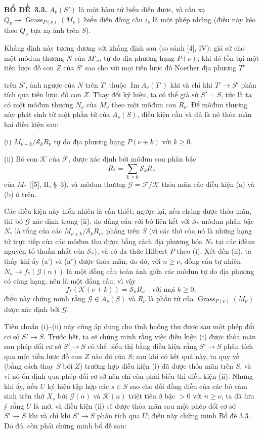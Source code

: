 \documentclass[11pt,twoside,openany]{book}
\numberwithin{equation}{section}
\newcommand{\src}[1]{%
  \phantomsection\hypertarget{src:\fgasourceid:#1}{}%
  \marginpar{\raggedleft\footnotesize\sffamily #1}%
}
\newcommand{\fgasourceid}{unset}
\newcommand{\result}[2]{\par\medskip\noindent\textbf{#1\if\relax\detokenize{#2}\relax\else\ #2\fi.}\quad}
\begin{document}
\result{BỔ ĐỀ}{3.3} $A_\nu(S')$ là một hàm tử biểu diễn được, và cấu xạ
$Q_\nu\longrightarrow\operatorname{Grass}_{P(\nu)}(M_\nu)$ biểu diễn đồng cấu
$i_\nu$ là một phép nhúng (điều này kéo theo $Q_\nu$ tựa xạ ảnh trên $S$).

Khẳng định này tương đương với khẳng định sau (so sánh [4], IV): giả sử cho
một môđun thương $N$ của $M'_\nu$, tự do địa phương hạng $P(\nu)$; khi đó tồn
tại một tiền lược đồ con $Z$ của $S'$ sao cho với mọi tiền lược đồ Noether địa
phương $T'$
\src{262}
trên $S'$, ảnh ngược của $N$ trên $T'$ thuộc
$\operatorname{Im}A_\nu(T')$ khi và chỉ khi $T'\longrightarrow S'$ phân tích
qua tiền lược đồ con $Z$. Thay đổi ký hiệu, ta có thể giả sử $S'=S$, tức là ta
có một môđun thương $N_\nu$ của $M_\nu$ theo một môđun con $R_\nu$. Để môđun
thương này phát sinh từ một phần tử của $A_\nu(S)$, điều kiện cần và đủ là nó
thỏa mãn hai điều kiện sau:

\medskip
\noindent (i) $M_{\nu+k}/\mathcal S_kR_\nu$ tự do địa phương hạng
$P(\nu+k)$ với $k\geq0$.

\smallskip
\noindent (ii) Bó con $\mathcal K$ của $\mathcal F$, được xác định bởi môđun
con phân bậc
\[
R_* =\sum_{k\geq0}\mathcal S_kR_\nu
\]
của $M_*$ ([5], II, \S~3), và môđun thương
$\mathcal G=\mathcal F/\mathcal K$ thỏa mãn các điều kiện (a) và (b) ở trên.

Các điều kiện này hiển nhiên là cần thiết; ngược lại, nếu chúng được thỏa mãn,
thì bó $\mathcal G$ xác định trong (ii), do đẳng cấu với bó liên kết với
$\mathcal S_*$-môđun phân bậc $N_*$ là tổng của các
$M_{\nu+k}/\mathcal S_kR_\nu$, phẳng trên $S$ (vì các thớ của nó là những hạng
tử trực tiếp của các môđun thu được bằng cách địa phương hóa $N_*$ tại các
iđêan nguyên tố thuần nhất của $\mathcal S_*$), và có đa thức Hilbert $P$ theo
(i). Xét đến (ii), ta
thấy khi ấy (a') và (a'') được thỏa mãn, do đó, với $n\geq\nu$, đồng cấu tự
nhiên $N_n\longrightarrow f_*(\mathcal G(n))$ là một đồng cấu toàn ánh giữa
các môđun tự do địa phương có cùng hạng, nên là một đẳng cấu; vì vậy
\[
f_*(\mathcal K(\nu+k))=\mathcal S_kR_\nu
\quad\text{với mọi $k\geq0$},
\]
điều này chứng minh rằng $\mathcal G\in A_\nu(S)$ và $R_\nu$ là phần tử của
$\operatorname{Grass}_{P(\nu)}(M_\nu)$ được xác định bởi $\mathcal G$.

Tiêu chuẩn (i)--(ii) này cũng áp dụng cho tình huống thu được sau một phép đổi
cơ sở $S'\longrightarrow S$. Trước hết, ta sẽ chứng minh rằng việc điều kiện
(i) được thỏa mãn sau phép đổi cơ sở $S'\longrightarrow S$ có thể biểu thị
bằng điều kiện rằng $S'\longrightarrow S$ phân tích qua một tiền lược đồ con
$Z$ nào đó của $S$; sau khi có kết quả này, ta quy về (bằng cách thay $S$ bởi
$Z$) trường hợp điều kiện (i) đã được thỏa mãn trên $S$, và vì nó ổn định qua
phép đổi cơ sở nên chỉ còn phải biểu thị điều kiện (ii). Nhưng khi ấy, nếu $U$
ký hiệu tập hợp các $s\in S$ sao cho đối đồng điều của các bó cảm sinh trên thớ
$X_s$ bởi $\mathcal G(n)$ và $\mathcal K(n)$ triệt tiêu ở bậc $>0$ với
$n\geq\nu$, ta đã lưu ý rằng $U$ là mở, và điều kiện (ii) sẽ được thỏa mãn sau
một phép đổi cơ sở $S'\longrightarrow S$ khi và chỉ khi
$S'\longrightarrow S$ phân tích qua $U$; điều này chứng minh Bổ đề 3.3. Do đó,
còn phải chứng minh bổ đề sau:
\end{document}
